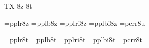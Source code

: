 
\ifx\ffdecl\undefined  \fi

\ffdecl [Palatino] {\rm \bf \it \bi} {\caps{\rm\bf}} {} {TX} {8z 8t}

\def\caps{\ffvars{r}{b}{!}{!}\ffsetV{caps}{c}\ffsetX} 
\def\nocaps{\ffsetX} 
\nocaps\relax %
\def\ffwarning#1{\ffmessage{FONT warning: Palatino - \string\caps#1 unavailable}}

\ismacro{}\ifttrue
   \font\tenrm=pplr8z   \sizespec
   \font\tenbf=pplb8z   \sizespec
   \font\tenit=pplri8z  \sizespec
   \font\tenbi=pplbi8z  \sizespec
   \font\tentt=pcrr8u   \sizespec
   \let\tensl=\tenit

   \def\ffnamegen{ppl\ffvarV\capsV 8z}

   
\fi

\ismacro{}\ifttrue
   \font\tenrm=pplr8t   \sizespec
   \font\tenbf=pplb8t   \sizespec
   \font\tenit=pplri8t  \sizespec
   \font\tenbi=pplbi8t  \sizespec
   \font\tentt=pcrr8t   \sizespec
   \let\tensl=\tenit

   \def\ffnamegen{ppl\ffvarV\capsV 8t}
\fi

\tenrm

\let\setsimplemath=\relax %

\def\palTeX{T\kern-.1667em\lower.3333ex\hbox{E}\kern-.125emX}
\ifx\origTeX\undefined \let\origTeX=\TeX \fi
\let\TeX=\palTeX

\ifx\loadmathfonts\relax \endinput \fi
\ifx\mathpreloaded X\else  \fi                     


